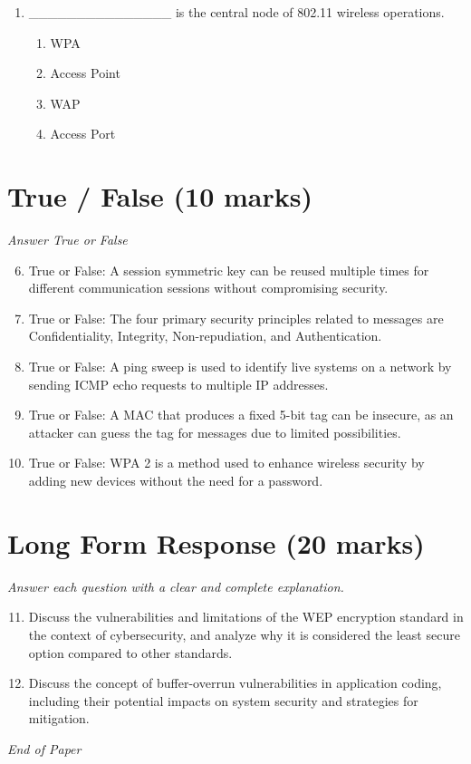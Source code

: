 \documentclass[12pt]{article}
\begin{document}
\begin{enumerate}[label=\arabic*.]
\begin{enumerate}[label=(\alph*)]
    \item Restart STP and retry the query, up to a limited number of retries.
    \item Remove a subset of the constraints and retry the query.
\end{enumerate}
\item \_\_\_\_\_\_\_\_\_\_\_\_\_\_\_ is the central node of 802.11 wireless operations.
\begin{enumerate}[label=(\alph*)]
    \item WPA
    \item Access Point
    \item WAP
    \item Access Port
\end{enumerate}
\end{enumerate}

\section*{True / False (10 marks)}
\textit{Answer True or False}
\begin{enumerate}[label=\arabic*.]
\setcounter{enumi}{5}
\item True or False: A session symmetric key can be reused multiple times for different communication sessions without compromising security.
\item True or False: The four primary security principles related to messages are Confidentiality, Integrity, Non-repudiation, and Authentication.
\item True or False: A ping sweep is used to identify live systems on a network by sending ICMP echo requests to multiple IP addresses.
\item True or False: A MAC that produces a fixed 5-bit tag can be insecure, as an attacker can guess the tag for messages due to limited possibilities.
\item True or False: WPA 2 is a method used to enhance wireless security by adding new devices without the need for a password.
\end{enumerate}

\section*{Long Form Response (20 marks)}
\textit{Answer each question with a clear and complete explanation.}
\begin{enumerate}[label=\arabic*.]
\setcounter{enumi}{10}
\item Discuss the vulnerabilities and limitations of the WEP encryption standard in the context of cybersecurity, and analyze why it is considered the least secure option compared to other standards.
\item Discuss the concept of buffer-overrun vulnerabilities in application coding, including their potential impacts on system security and strategies for mitigation.
\end{enumerate}

\vfill
\noindent\textit{End of Paper}
\end{document}
